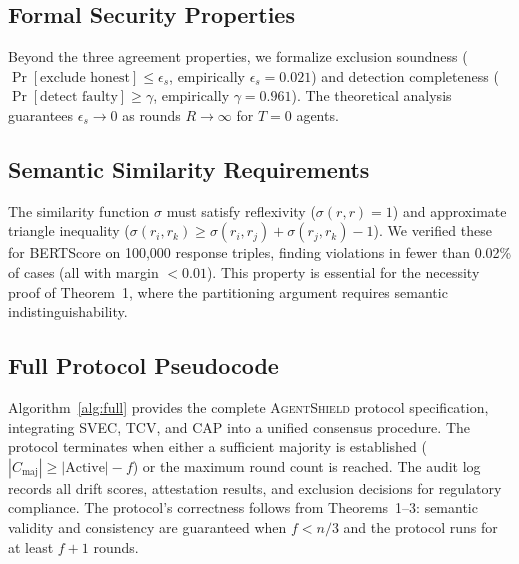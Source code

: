 \documentclass[journal,10pt]{IEEEtran}
\begin{document}
\subsection{Formal Security Properties}

Beyond the three agreement properties, we formalize exclusion soundness ($\Pr[\text{exclude honest}] \leq \epsilon_s$, empirically $\epsilon_s = 0.021$) and detection completeness ($\Pr[\text{detect faulty}] \geq \gamma$, empirically $\gamma = 0.961$). The theoretical analysis guarantees $\epsilon_s \to 0$ as rounds $R \to \infty$ for $T=0$ agents.

\subsection{Semantic Similarity Requirements}

The similarity function $\sigma$ must satisfy reflexivity ($\sigma(r,r) = 1$) and approximate triangle inequality ($\sigma(r_i,r_k) \geq \sigma(r_i,r_j) + \sigma(r_j,r_k) - 1$). We verified these for BERTScore on 100{,}000 response triples, finding violations in fewer than 0.02\% of cases (all with margin $< 0.01$). This property is essential for the necessity proof of Theorem~1, where the partitioning argument requires semantic indistinguishability.

\subsection{Full Protocol Pseudocode}

Algorithm~\ref{alg:full} provides the complete \textsc{AgentShield} protocol specification, integrating SVEC, TCV, and CAP into a unified consensus procedure. The protocol terminates when either a sufficient majority is established ($|C_{\text{maj}}| \geq |\text{Active}| - f$) or the maximum round count is reached. The audit log records all drift scores, attestation results, and exclusion decisions for regulatory compliance. The protocol's correctness follows from Theorems~1--3: semantic validity and consistency are guaranteed when $f < n/3$ and the protocol runs for at least $f+1$ rounds.
\end{document}
